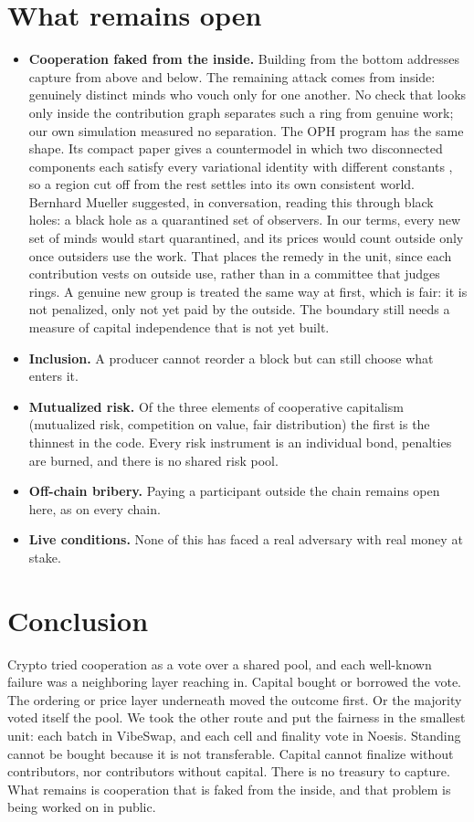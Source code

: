 \documentclass[11pt]{article}
\begin{document}
\section{What remains open}

\begin{itemize}
\item \textbf{Cooperation faked from the inside.} Building from the bottom addresses capture from above and below. The remaining attack comes from inside: genuinely distinct minds who vouch only for one another. No check that looks only inside the contribution graph separates such a ring from genuine work; our own simulation measured no separation. The OPH program has the same shape. Its compact paper gives a countermodel in which two disconnected components each satisfy every variational identity with different constants \cite{oph}, so a region cut off from the rest settles into its own consistent world. Bernhard Mueller suggested, in conversation, reading this through black holes: a black hole as a quarantined set of observers. In our terms, every new set of minds would start quarantined, and its prices would count outside only once outsiders use the work. That places the remedy in the unit, since each contribution vests on outside use, rather than in a committee that judges rings. A genuine new group is treated the same way at first, which is fair: it is not penalized, only not yet paid by the outside. The boundary still needs a measure of capital independence that is not yet built.
\item \textbf{Inclusion.} A producer cannot reorder a block but can still choose what enters it.
\item \textbf{Mutualized risk.} Of the three elements of cooperative capitalism (mutualized risk, competition on value, fair distribution) the first is the thinnest in the code. Every risk instrument is an individual bond, penalties are burned, and there is no shared risk pool.
\item \textbf{Off-chain bribery.} Paying a participant outside the chain remains open here, as on every chain.
\item \textbf{Live conditions.} None of this has faced a real adversary with real money at stake.
\end{itemize}

\section{Conclusion}

Crypto tried cooperation as a vote over a shared pool, and each well-known failure was a neighboring layer reaching in. Capital bought or borrowed the vote. The ordering or price layer underneath moved the outcome first. Or the majority voted itself the pool. We took the other route and put the fairness in the smallest unit: each batch in VibeSwap, and each cell and finality vote in Noesis. Standing cannot be bought because it is not transferable. Capital cannot finalize without contributors, nor contributors without capital. There is no treasury to capture. What remains is cooperation that is faked from the inside, and that problem is being worked on in public.
\end{document}
